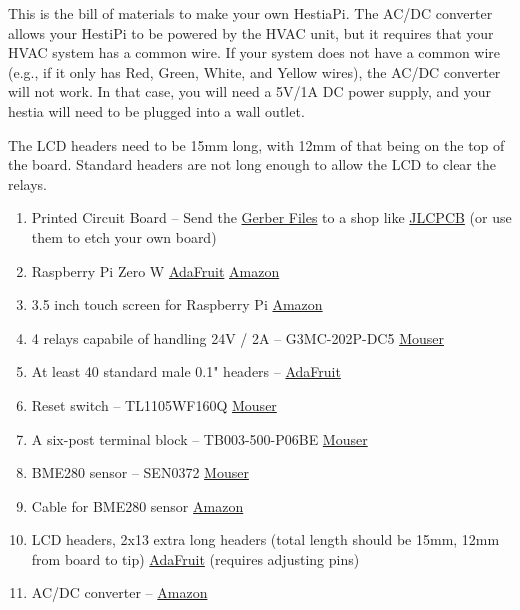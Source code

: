 This is the bill of materials to make your own HestiaPi.  The AC/DC converter
allows your HestiPi to be powered by the HVAC unit, but it requires that your
HVAC system has a common wire.  If your system does not have a common wire
(e.g., if it only has Red, Green, White, and Yellow wires), the AC/DC converter
will not work.  In that case, you will need a 5V/1A DC power supply, and your
hestia will need to be plugged into a wall outlet.

The LCD headers need to be 15mm long, with 12mm of that being on the top of the
board.  Standard headers are not long enough to allow the LCD to clear the
relays.

\begin{enumerate}
  \item Printed Circuit Board -- Send the 
        \href{https://github.com/HestiaPi/hestia-touch-pcb-dev/tree/master/HestiaPi-ONE/Gerber}{Gerber Files}
        to a shop like \href{https://jlcpcb.com/}{JLCPCB} (or use them to etch
        your own board)
  \item Raspberry Pi Zero W \href{https://www.adafruit.com/product/3400}{AdaFruit} \href{https://smile.amazon.com/Raspberry-Pi-Zero-Wireless-model/dp/B06XFZC3BX/}{Amazon}
  \item 3.5 inch touch screen for Raspberry Pi \href{https://smile.amazon.com/gp/product/B01CNJVG8K/}{Amazon}
  \item 4 relays capabile of handling 24V / 2A -- G3MC-202P-DC5 \href{https://www.mouser.com/ProductDetail/653-G3MC-202P-DC5}{Mouser}
  \item At least 40 standard male 0.1" headers -- \href{https://www.adafruit.com/product/3009}{AdaFruit}
  \item Reset switch -- TL1105WF160Q \href{https://www.mouser.com/ProductDetail/612-TL1105W}{Mouser}
  \item A six-post terminal block -- TB003-500-P06BE \href{https://www.mouser.com/ProductDetail/490-TB003-500-P06BE}{Mouser}
  \item BME280 sensor -- SEN0372 \href{https://www.mouser.com/ProductDetail/426-SEN0372}{Mouser}
  \item Cable for BME280 sensor \href{https://smile.amazon.com/dp/B0789F523N/}{Amazon}
  \item LCD headers, 2x13 extra long headers (total length should be 15mm, 12mm from board to tip) \href{https://www.adafruit.com/product/400}{AdaFruit} (requires adjusting pins)
  \item AC/DC converter -- \href{https://smile.amazon.com/dp/B00RE6QN4U/}{Amazon}
\end{enumerate}
